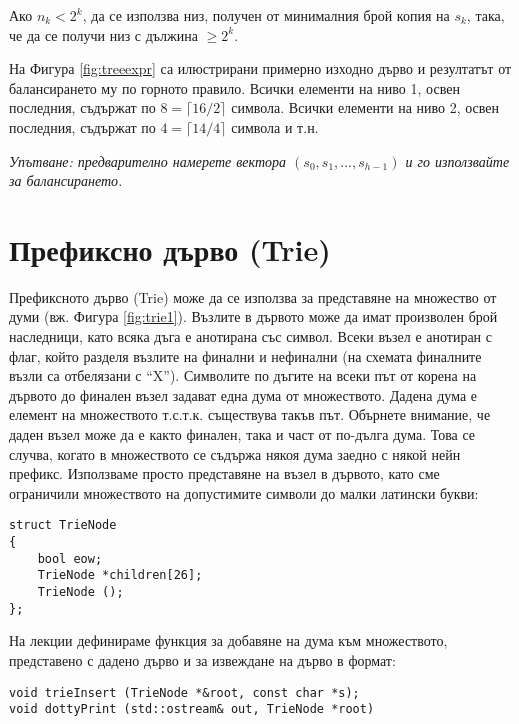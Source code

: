 \begin{enumerate}[resume]
\begin{enumerate}[label=\alph*)]
    Ако $n_k < 2^k$, да се използва низ, получен от минималния брой копия на $s_k$, така, че да се получи низ с дължина $\geq 2^k$.
  \end{enumerate}

  На Фигура \ref{fig:treeexpr} са илюстрирани примерно изходно дърво и резултатът от балансирането му по горното правило. Всички елементи на ниво 1, освен последния, съдържат по $8=\lceil{16/2}\rceil$ символа. Всички елементи на ниво 2, освен последния, съдържат по $4=\lceil{14/4}\rceil$ символа и т.н.


  \emph{Упътване: предварително намерете вектора $(s_0,s_1,...,s_{h-1})$ и го използвайте за балансирането.}
\end{enumerate}

\pagebreak

\section{Префиксно дърво (Trie)}



\begin{mdframed}[hidealllines=true,backgroundcolor=gray!20]
Префиксното дърво (Trie) може да се използва за представяне на множество от думи (вж. Фигура \ref{fig:trie1}). Възлите в дървото може да имат произволен брой наследници, като всяка дъга е анотирана със символ. Всеки възел е анотиран с флаг, който разделя възлите на финални и нефинални (на схемата финалните възли са отбелязани с ``X''). Символите по дъгите на всеки път от корена на дървото до финален възел задават една дума от множеството. Дадена дума е елемент на множеството т.с.т.к. съществува такъв път. Обърнете внимание, че даден възел може да е както финален, така и част от по-дълга дума. Това се случва, когато в множеството се съдържа някоя дума заедно с някой нейн префикс.
Използваме просто представяне на възел в дървото, като сме ограничили множеството на допустимите символи до малки латински букви:

\begin{verbatim}
struct TrieNode
{
    bool eow;
    TrieNode *children[26];
    TrieNode ();
};
\end{verbatim}
На лекции дефинираме функция за добавяне на дума към множеството, представено с дадено дърво и за извеждане на дърво в  формат:
\begin{verbatim}
void trieInsert (TrieNode *&root, const char *s);
void dottyPrint (std::ostream& out, TrieNode *root)

\end{verbatim}
\end{mdframed}

